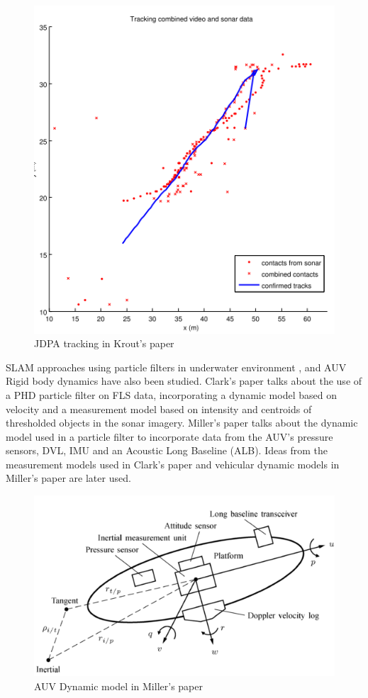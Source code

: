 \documentclass[15pt]{article}
\begin{document}
\begin{figure}[h!]
  \centering
  \includegraphics[scale=0.4]{jdpa}
  \captionsetup{justification=centering}
  \caption{JDPA tracking in Krout's paper}
\end{figure}

SLAM approaches using particle filters in underwater environment \cite{Clark2007}, and AUV Rigid body dynamics \cite{Miller2010} have also been studied. Clark's paper talks about the use of a PHD particle filter on FLS data, incorporating a dynamic model based on velocity and a measurement model based on intensity and centroids of thresholded objects in the sonar imagery. Miller's paper talks about the dynamic model used in a particle filter to incorporate data from the AUV's pressure sensors, DVL, IMU and an Acoustic Long Baseline (ALB). Ideas from the measurement models used in Clark's paper and vehicular dynamic models in Miller's paper are later used.

\begin{figure}[h!]
  \centering
  \includegraphics[scale=0.4]{vmodel}
  \captionsetup{justification=centering}
  \caption{AUV Dynamic model in Miller's paper}
\end{figure}
\end{document}
